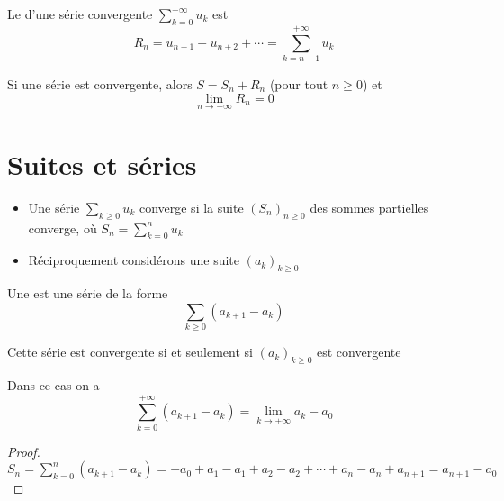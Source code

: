 \begin{frame}

Le  d'une série convergente $\displaystyle\sum_{k = 0}^{+\infty} u_k$ \pause est
$$R_n = u_{n+1}+u_{n+2}+\cdots = \sum_{k=n+1}^{+\infty} u_k$$

\pause
\begin{proposition}
Si une série est convergente, alors 
$S=S_n+R_n$ (pour tout $n\ge0$) \pause et 
$$\lim_{n\to+\infty} R_n=0$$
\end{proposition}


\end{frame}


\section{Suites et séries}

\begin{frame}

\begin{itemize}
\item Une série $\sum_{k \ge 0} u_k$ converge si la suite 
$(S_n)_{n\ge0}$ des sommes partielles converge, où $S_n=\sum_{k=0}^n u_k$

\item\pause Réciproquement considérons une suite $(a_k)_{k\ge0}$
\end{itemize}

\pause
\begin{proposition}
Une  est une série de la forme
$$\sum_{k\ge0} (a_{k+1}-a_k)$$

\pause
Cette série est convergente si et seulement si $(a_k)_{k\ge0}$ est convergente

\pause
Dans ce cas on a 
\vspace{-.2cm}
$$\sum_{k=0}^{+\infty} (a_{k+1}-a_k) = \lim_{k\to+\infty} a_k - a_0$$
\end{proposition}

\pause
\begin{proof}
$
S_n
= \sum_{k=0}^n (a_{k+1}-a_k)
= -a_0 +a_1-a_1+a_2-a_2+ \cdots +a_n-a_n+a_{n+1}
= a_{n+1}-a_0 $
\end{proof}
\end{frame}

